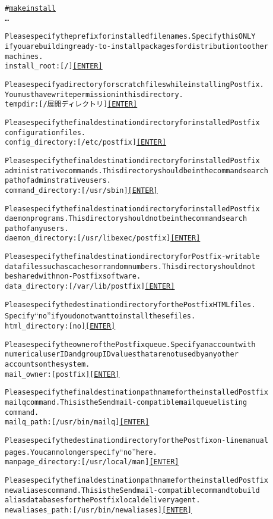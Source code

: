 \begin{center}
\begin{breakbox}
\begin{alltt}
# \underline{make install}
…

Please specify the prefix for installed file names. Specify this ONLY
if you are building ready-to-install packages for distribution to other
machines.
install_root: [/]  \underline{[ENTER]}

Please specify a directory for scratch files while installing Postfix.
You must have write permission in this directory.
tempdir: [/展開ディレクトリ]  \underline{[ENTER]}

Please specify the final destination directory for installed Postfix
configuration files.
config_directory: [/etc/postfix]  \underline{[ENTER]}

Please specify the final destination directory for installed Postfix
administrative commands. This directory should be in the command search
path of adminstrative users.
command_directory: [/usr/sbin]  \underline{[ENTER]}

Please specify the final destination directory for installed Postfix
daemon programs. This directory should not be in the command search
path of any users.
daemon_directory: [/usr/libexec/postfix]  \underline{[ENTER]}

Please specify the final destination directory for Postfix-writable
data files such as caches or random numbers. This directory should not
be shared with non-Postfix software.
data_directory: [/var/lib/postfix]  \underline{[ENTER]}

Please specify the destination directory for the Postfix HTML files.
Specify ``no'' if you do not want to install these files.
html_directory: [no]  \underline{[ENTER]}

Please specify the owner of the Postfix queue. Specify an account with
numerical user ID and group ID values that are not used by any other
accounts on the system.
mail_owner: [postfix]  \underline{[ENTER]}

Please specify the final destination pathname for the installed Postfix
mailq command. This is the Sendmail-compatible mail queue listing
command.
mailq_path: [/usr/bin/mailq]  \underline{[ENTER]}

Please specify the destination directory for the Postfix on-line manual
pages. You can no longer specify ``no'' here.
manpage_directory: [/usr/local/man]  \underline{[ENTER]}

Please specify the final destination pathname for the installed Postfix
newaliases command. This is the Sendmail-compatible command to build
alias databases for the Postfix local delivery agent.
newaliases_path: [/usr/bin/newaliases]  \underline{[ENTER]}


\end{alltt}
\end{breakbox}
\end{center}
